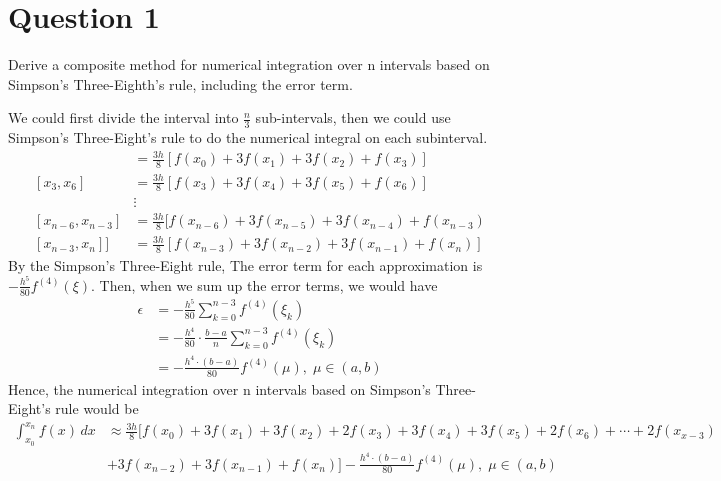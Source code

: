 \section{Question 1}

\begin{question}
    Derive a composite method for numerical integration over n intervals based on Simpson’s Three-Eighth’s rule, including the error term.
\end{question}

\begin{answer}
    We could first divide the interval into $\tfrac{n}{3}$ sub-intervals, then we could use Simpson's Three-Eight's rule to do the numerical integral on each subinterval.
    \begin{align}
        [x_0,x_3] &= \tfrac{3h}{8}[f(x_0) + 3f(x_1) + 3f(x_2) + f(x_3)]\\
        [x_3,x_6] &= \tfrac{3h}{8}[f(x_3) + 3f(x_4) + 3f(x_5) + f(x_6)]\\
        & \vdots \\
        [x_{n-6},x_{n-3}] &= \tfrac{3h}{8}[f(x_{n-6}) + 3f(x_{n-5}) + 3f(x_{n-4}) + f(x_{n-3})\\
        [x_{n-3},x_{n}]] &= \tfrac{3h}{8}[f(x_{n-3}) + 3f(x_{n-2}) + 3f(x_{n-1}) + f(x_n)]
    \end{align}
    By the Simpson's Three-Eight rule, The error term for each approximation is $-\tfrac{h^5}{80}f^{(4)}(\xi)$. Then, when we sum up the error terms, we would have
    \begin{align}
        \epsilon &= -\tfrac{h^5}{80}\sum_{k = 0}^{n-3}f^{(4)}(\xi_k)\\
        &= -\tfrac{h^4}{80}\cdot\tfrac{b-a}{n}\sum_{k = 0}^{n-3}f^{(4)}(\xi_k)\\
        &= -\tfrac{h^4\cdot(b-a)}{80}f^{(4)}(\mu), \; \mu \in (a,b)
    \end{align}
    Hence, the numerical integration over n intervals based on Simpson's Three-Eight's rule would be
    \begin{equation}
        \begin{aligned}
            \int_{x_0}^{x_n}f(x) \,dx &\approx \tfrac{3h}{8}[f(x_0) + 3f(x_1) + 3f(x_2) + 2f(x_3) + 3f(x_4) + 3f(x_5) + 2f(x_6) + \cdots + 2f(x_{x-3})\\
            &+ 3f(x_{n-2}) + 3f(x_{n-1}) + f(x_n)] - \tfrac{h^4\cdot(b-a)}{80}f^{(4)}(\mu), \; \mu \in (a,b)\\
        \end{aligned}
    \end{equation}
\end{answer}